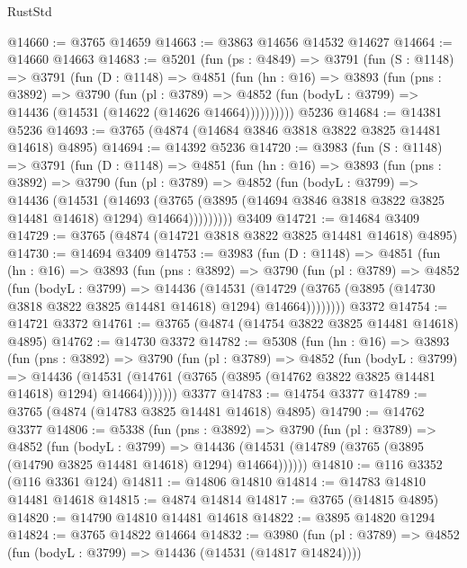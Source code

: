 \begin{lexlean}{RustStd}
\begin{coremodule}
@14660 := @3765 @14659
@14663 := @3863 @14656 @14532 @14627
@14664 := @14660 @14663
@14683 := @5201
    (fun (ps : @4849) =>
    @3791
      (fun (S : @1148) =>
      @3791
        (fun (D : @1148) =>
        @4851
          (fun (hn : @16) =>
          @3893
            (fun (pns : @3892) =>
            @3790
              (fun (pl : @3789) =>
              @4852 (fun (bodyL : @3799) => @14436 (@14531 (@14622 (@14626 @14664))))))))))
    @5236
@14684 := @14381 @5236
@14693 := @3765 (@4874 (@14684 @3846 @3818 @3822 @3825 @14481 @14618) @4895)
@14694 := @14392 @5236
@14720 := @3983
    (fun (S : @1148) =>
    @3791
      (fun (D : @1148) =>
      @4851
        (fun (hn : @16) =>
        @3893
          (fun (pns : @3892) =>
          @3790
            (fun (pl : @3789) =>
            @4852
              (fun (bodyL : @3799) =>
              @14436
                (@14531
                  (@14693
                    (@3765
                      (@3895 (@14694 @3846 @3818 @3822 @3825 @14481 @14618) @1294)
                      @14664)))))))))
    @3409
@14721 := @14684 @3409
@14729 := @3765 (@4874 (@14721 @3818 @3822 @3825 @14481 @14618) @4895)
@14730 := @14694 @3409
@14753 := @3983
    (fun (D : @1148) =>
    @4851
      (fun (hn : @16) =>
      @3893
        (fun (pns : @3892) =>
        @3790
          (fun (pl : @3789) =>
          @4852
            (fun (bodyL : @3799) =>
            @14436
              (@14531
                (@14729 (@3765 (@3895 (@14730 @3818 @3822 @3825 @14481 @14618) @1294) @14664))))))))
    @3372
@14754 := @14721 @3372
@14761 := @3765 (@4874 (@14754 @3822 @3825 @14481 @14618) @4895)
@14762 := @14730 @3372
@14782 := @5308
    (fun (hn : @16) =>
    @3893
      (fun (pns : @3892) =>
      @3790
        (fun (pl : @3789) =>
        @4852
          (fun (bodyL : @3799) =>
          @14436
            (@14531 (@14761 (@3765 (@3895 (@14762 @3822 @3825 @14481 @14618) @1294) @14664)))))))
    @3377
@14783 := @14754 @3377
@14789 := @3765 (@4874 (@14783 @3825 @14481 @14618) @4895)
@14790 := @14762 @3377
@14806 := @5338
    (fun (pns : @3892) =>
    @3790
      (fun (pl : @3789) =>
      @4852
        (fun (bodyL : @3799) =>
        @14436 (@14531 (@14789 (@3765 (@3895 (@14790 @3825 @14481 @14618) @1294) @14664))))))
@14810 := @116 @3352 (@116 @3361 @124)
@14811 := @14806 @14810
@14814 := @14783 @14810 @14481 @14618
@14815 := @4874 @14814
@14817 := @3765 (@14815 @4895)
@14820 := @14790 @14810 @14481 @14618
@14822 := @3895 @14820 @1294
@14824 := @3765 @14822 @14664
@14832 := @3980
    (fun (pl : @3789) => @4852 (fun (bodyL : @3799) => @14436 (@14531 (@14817 @14824))))

\end{coremodule}
\end{lexlean}
